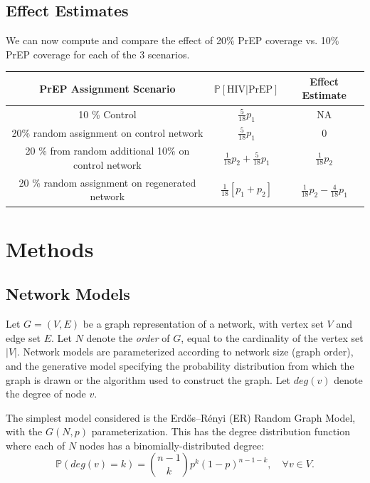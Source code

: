 \documentclass{article}
\theoremstyle{definition}
\begin{document}
\subsection{Effect Estimates}
We can now compute and compare the effect of 20\% PrEP coverage vs. 10\% PrEP coverage for each of the 3 scenarios.
\begin{center}
    \begin{tabular}{|c|c|c|}
    \hline
    PrEP Assignment Scenario     & $\mathbb{P}\left[\text{HIV} \vert \text{PrEP}\right]$ &  Effect Estimate  \\
         \hline
      10 \% Control   & $\frac{5}{18}p_{1}$ & NA\\
      \hline
      20\% random assignment on control network & $\frac{5}{18}p_{1}$ & 0 \\
      \hline
      20 \% from random additional 10\% on control network & $\frac{1}{18}p_{2}+\frac{5}{18}p_{1}$ & $\frac{1}{18}p_{2}$\\
      \hline
      20 \% random assignment on regenerated network & $\frac{1}{18}\left[p_{1}+p_{2}\right]$ & $\frac{1}{18}p_{2}-\frac{4}{18}p_{1}$\\
      \hline                 
    \end{tabular}                                      
    \end{center}
\section{Methods}
\subsection{Network Models}
Let $G=(V,E)$ be a graph representation of a network, with vertex set $V$ and edge set $E$. Let $N$ denote the \textit{order} of $G$, equal to the cardinality of the vertex set $\vert V \vert$. Network models are parameterized according to network size (graph order), and the generative model specifying the probability distribution from which the graph is drawn or the algorithm used to construct the graph. Let $deg(v)$ denote the degree of node $v$.

The simplest model considered is the  Erdős–Rényi (ER) Random Graph Model, with the $G(N,p)$ parameterization. This has the degree distribution function where each of $N$ nodes has a binomially-distributed degree:
\begin{equation*}
    \mathbb{P}(deg(v)=k)=\binom{n-1}{k}p^{k}\left(1-p\right)^{n-1-k}, \quad \forall v \in V . 
\end{equation*}
\end{document}
